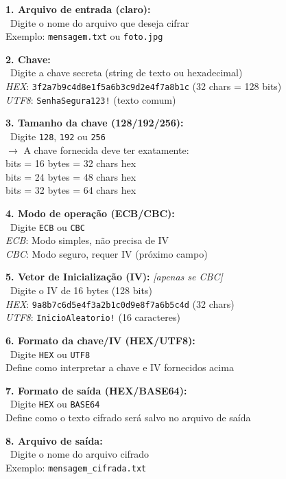 \documentclass[12pt,a4paper]{article}
\begin{document}
\begin{tcolorbox}[colback=primaryblue!10,colframe=primaryblue,title={\faLock\ Campos para Cifragem AES}]

\textbf{1. Arquivo de entrada (claro):}\\
\quad \faFileAlt\ Digite o nome do arquivo que deseja cifrar\\
\quad Exemplo: \texttt{mensagem.txt} ou \texttt{foto.jpg}

\textbf{2. Chave:}\\
\quad \faKey\ Digite a chave secreta (string de texto ou hexadecimal)\\
\quad \textit{HEX}: \texttt{3f2a7b9c4d8e1f5a6b3c9d2e4f7a8b1c} (32 chars = 128 bits)\\
\quad \textit{UTF8}: \texttt{SenhaSegura123!} (texto comum)

\textbf{3. Tamanho da chave (128/192/256):}\\
\quad \faHashtag\ Digite \texttt{128}, \texttt{192} ou \texttt{256}\\
\quad $\rightarrow$ A chave fornecida deve ter exatamente:\\
\quad {} bits = 16 bytes = 32 chars hex\\
\quad {} bits = 24 bytes = 48 chars hex\\
\quad {} bits = 32 bytes = 64 chars hex

\textbf{4. Modo de operação (ECB/CBC):}\\
\quad \faCogs\ Digite \texttt{ECB} ou \texttt{CBC}\\
\quad \textit{ECB}: Modo simples, não precisa de IV\\
\quad \textit{CBC}: Modo seguro, requer IV (próximo campo)

\textbf{5. Vetor de Inicialização (IV):} \textit{[apenas se CBC]}\\
\quad \faRandom\ Digite o IV de 16 bytes (128 bits)\\
\quad \textit{HEX}: \texttt{9a8b7c6d5e4f3a2b1c0d9e8f7a6b5c4d} (32 chars)\\
\quad \textit{UTF8}: \texttt{InicioAleatorio!} (16 caracteres)

\textbf{6. Formato da chave/IV (HEX/UTF8):}\\
\quad \faCode\ Digite \texttt{HEX} ou \texttt{UTF8}\\
\quad Define como interpretar a chave e IV fornecidos acima

\textbf{7. Formato de saída (HEX/BASE64):}\\
\quad \faFileCode\ Digite \texttt{HEX} ou \texttt{BASE64}\\
\quad Define como o texto cifrado será salvo no arquivo de saída

\textbf{8. Arquivo de saída:}\\
\quad \faSave\ Digite o nome do arquivo cifrado\\
\quad Exemplo: \texttt{mensagem\_cifrada.txt}

\end{tcolorbox}
\end{document}
